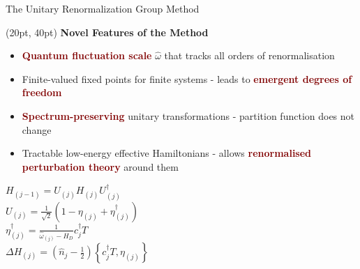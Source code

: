 \documentclass[aspectratio=169]{beamer}
\newcommand{\head}[1]{
\begin{textblock*}{\textwidth}(20pt, 40pt)
\textbf{\Large {#1}}
\end{textblock*}
}
\newcommand{\focus}[1]{\textcolor{maroon}{\textbf{#1}}}
\begin{document}
\begin{frame}[noframenumbering]{The Unitary Renormalization Group Method}
\head{Novel Features of the Method}
\begin{minipage}{0.65\textwidth}
\begin{itemize}[<+->]
	\item \focus{Quantum fluctuation scale} \(\hat \omega\)	that tracks all orders of renormalisation\\[10pt]
	\item Finite-valued fixed points for finite systems - leads to \focus{emergent degrees of freedom}\\[10pt]
	\item \focus{Spectrum-preserving} unitary transformations - partition function does not change\\[10pt]
	\item Tractable low-energy effective Hamiltonians - allows \focus{renormalised perturbation theory} around them 
\end{itemize}
\end{minipage}
\hspace*{\fill}
\begin{minipage}{0.3\textwidth}
\begin{flushleft}
	\(H_{(j-1)} = U_{(j)} H_{(j)} U_{(j)}^\dagger\)\\[15pt]
	\(U_{(j)} = \frac{1}{\sqrt 2}\left(1 - \eta_{(j)} + \eta_{(j)}^\dagger\right) \)\\[15pt]
	\( \eta^\dagger_{(j)} = \frac{1}{\hat \omega_{(j)} - H_D}c^\dagger_j T\)\\[15pt]
	\( \Delta H_{(j)} = \left(\hat n_j - \frac{1}{2}\right) \left\{c^\dagger_j T, \eta_{(j)}\right\} \)
\end{flushleft}
\end{minipage}
\end{frame}
\end{document}
